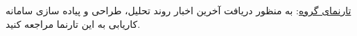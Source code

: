 \href{http://tahlilgaranetarrahesystem.blog.ir/}{تارنمای گروه}: 
به منظور دریافت آخرین اخبار روند تحلیل، طراحی و پیاده سازی سامانه کاریابی به این تارنما مراجعه کنید.



